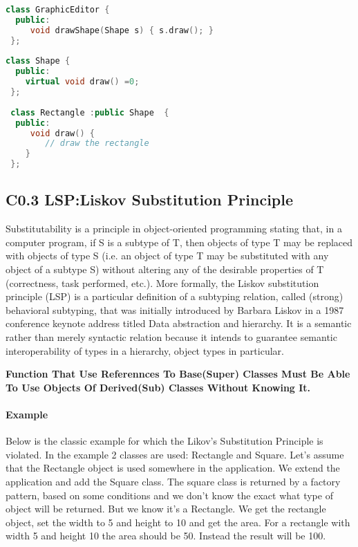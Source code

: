 \documentclass{book}
\begin{document}
\begin{lstlisting}[caption={Open-Close Principle - good example}, language=C++]
class GraphicEditor {
  public:
     void drawShape(Shape s) { s.draw(); }
 };
 
class Shape {
  public:
 	virtual void draw() =0;
 };
 
 class Rectangle :public Shape  {
  public:
     void draw() {
 		// draw the rectangle
 	}
 };
\end{lstlisting}

\subsection{C0.3 LSP:Liskov Substitution Principle}\label{LSP}
Substitutability is a principle in object-oriented programming stating that, in a computer program, if S is a subtype of T, 
then objects of type T may be replaced with objects of type S (i.e. an object of type T may be substituted with any object of a subtype S) 
without altering any of the desirable properties of T (correctness, task performed, etc.).
More formally, the Liskov substitution principle (LSP) is a particular definition of a subtyping relation,
called (strong) behavioral subtyping, that was initially introduced by Barbara Liskov in a 1987 conference keynote address titled Data abstraction and hierarchy.
It is a semantic rather than merely syntactic relation because it intends to guarantee semantic interoperability of types in a hierarchy, object types in particular.

\textbf{Function That Use Referennces To Base(Super) Classes Must Be Able To Use Objects Of Derived(Sub) Classes Without Knowing It.}

\paragraph{Example}

Below is the classic example for which the Likov's Substitution Principle is violated.
In the example 2 classes are used: Rectangle and Square. Let's assume that the Rectangle object is used somewhere in the application.
We extend the application and add the Square class. The square class is returned by a factory pattern, based on some conditions and we don't know the exact what type of object will be returned.
But we know it's a Rectangle. We get the rectangle object, set the width to 5 and height to 10 and get the area.
For a rectangle with width 5 and height 10 the area should be 50. Instead the result will be 100.
\end{document}
